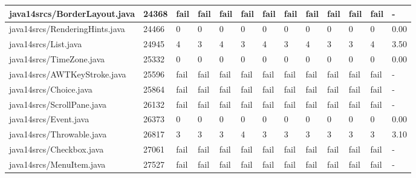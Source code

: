 \begin{tabular}{|l|l|l|l|l|l|l|l|l|l|l|l|l|}
\hline
java14srcs/BorderLayout.java                       & 24368       & fail      & fail      & fail      & fail      & fail      & fail      & fail      & fail      & fail      & fail      & -         \\
\hline
java14srcs/RenderingHints.java                     & 24466       & 0         & 0         & 0         & 0         & 0         & 0         & 0         & 0         & 0         & 0         & 0.00      \\
\hline
java14srcs/List.java                               & 24945       & 4         & 3         & 4         & 3         & 4         & 3         & 4         & 3         & 3         & 4         & 3.50      \\
\hline
java14srcs/TimeZone.java                           & 25332       & 0         & 0         & 0         & 0         & 0         & 0         & 0         & 0         & 0         & 0         & 0.00      \\
\hline
java14srcs/AWTKeyStroke.java                       & 25596       & fail      & fail      & fail      & fail      & fail      & fail      & fail      & fail      & fail      & fail      & -         \\
\hline
java14srcs/Choice.java                             & 25864       & fail      & fail      & fail      & fail      & fail      & fail      & fail      & fail      & fail      & fail      & -         \\
\hline
java14srcs/ScrollPane.java                         & 26132       & fail      & fail      & fail      & fail      & fail      & fail      & fail      & fail      & fail      & fail      & -         \\
\hline
java14srcs/Event.java                              & 26373       & 0         & 0         & 0         & 0         & 0         & 0         & 0         & 0         & 0         & 0         & 0.00      \\
\hline
java14srcs/Throwable.java                          & 26817       & 3         & 3         & 3         & 4         & 3         & 3         & 3         & 3         & 3         & 3         & 3.10      \\
\hline
java14srcs/Checkbox.java                           & 27061       & fail      & fail      & fail      & fail      & fail      & fail      & fail      & fail      & fail      & fail      & -         \\
\hline
java14srcs/MenuItem.java                           & 27527       & fail      & fail      & fail      & fail      & fail      & fail      & fail      & fail      & fail      & fail      & -         \\

\end{tabular}
